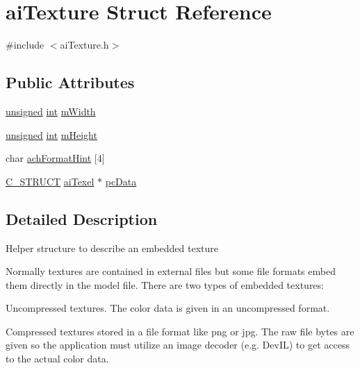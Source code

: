 \hypertarget{structai_texture}{\section{ai\-Texture Struct Reference}
\label{structai_texture}
}


{\ttfamily \#include $<$ai\-Texture.\-h$>$}

\subsection*{Public Attributes}
\begin{DoxyCompactItemize}
\item 
\hyperlink{_free_image_8h_a425076c7067a1b5166e2cc530e914814}{unsigned} \hyperlink{wglew_8h_a500a82aecba06f4550f6849b8099ca21}{int} \hyperlink{structai_texture_aaa3ad8cfe44fdc4dea2db91977d92234}{m\-Width}
\item 
\hyperlink{_free_image_8h_a425076c7067a1b5166e2cc530e914814}{unsigned} \hyperlink{wglew_8h_a500a82aecba06f4550f6849b8099ca21}{int} \hyperlink{structai_texture_ac1e2fa6f1f646e9c55e3985d4418a752}{m\-Height}
\item 
char \hyperlink{structai_texture_aa9f44996acf3b301bfeb4e5348311540}{ach\-Format\-Hint} \mbox{[}4\mbox{]}
\item 
\hyperlink{ai_defines_8h_ab51df4230ceb602bbc1bc109c432a6a0}{C\-\_\-\-S\-T\-R\-U\-C\-T} \hyperlink{structai_texel}{ai\-Texel} $\ast$ \hyperlink{structai_texture_aeb07528748b6e49d2d81c60006024f9a}{pc\-Data}
\end{DoxyCompactItemize}


\subsection{Detailed Description}
Helper structure to describe an embedded texture

Normally textures are contained in external files but some file formats embed them directly in the model file. There are two types of embedded textures\-:
\begin{DoxyEnumerate}
\item Uncompressed textures. The color data is given in an uncompressed format.
\item Compressed textures stored in a file format like png or jpg. The raw file bytes are given so the application must utilize an image decoder (e.\-g. Dev\-I\-L) to get access to the actual color data. 
\end{DoxyEnumerate}

